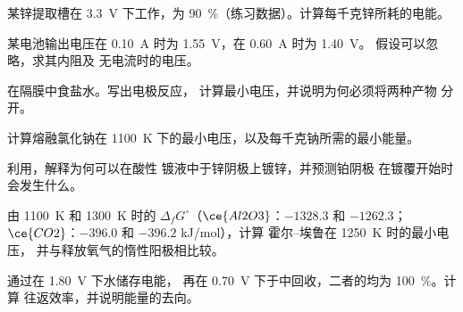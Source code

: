 \begin{exercise}[$\star\star$]\label{exo:b2:batteries-electrolysis:6}
某锌提取槽在 \qty{3.3}{V} 下工作，为
90~\%（练习数据）。计算每千克锌所耗的电能。
\end{exercise}

\begin{exercise}[$\star\star$]\label{exo:b2:batteries-electrolysis:7}
某电池输出电压在 \qty{0.10}{A} 时为 \qty{1.55}{V}，在 \qty{0.60}{A} 时为 \qty{1.40}{V}。
假设可以忽略，求其内阻及
无电流时的电压。
\end{exercise}

\begin{exercise}[$\star\star$]\label{exo:b2:batteries-electrolysis:8}
在隔膜中食盐水。写出电极反应，
计算最小电压，并说明为何必须将两种产物
分开。
\end{exercise}

\begin{exercise}[$\star\star$]\label{exo:b2:batteries-electrolysis:9}
计算熔融氯化钠在
\qty{1100}{K} 下的最小电压，以及每千克钠所需的最小能量。
\end{exercise}

\begin{exercise}[$\star\star\star$]\label{exo:b2:batteries-electrolysis:10}
利用，解释为何可以在酸性
镀液中于锌阴极上镀锌，并预测铂阴极
在镀覆开始时会发生什么。
\end{exercise}

\begin{exercise}[$\star\star\star$]\label{exo:b2:batteries-electrolysis:11}
由 \qty{1100}{K} 和 \qty{1300}{K} 时的 $\Delta_f G^\circ$（$\ce{Al2O3}$：$-1328.3$ 和
$-1262.3$；$\ce{CO2}$：$-396.0$ 和 $-396.2$ \unit{kJ/mol}），计算
霍尔–埃鲁在 \qty{1250}{K} 时的最小电压，
并与释放氧气的惰性阳极相比较。
\end{exercise}

\begin{exercise}[$\star\star\star$]\label{exo:b2:batteries-electrolysis:12}
通过在 \qty{1.80}{V} 下水储存电能，
再在 \qty{0.70}{V} 下于中回收，二者的均为 100~\%。计算
往返效率，并说明能量的去向。
\end{exercise}

